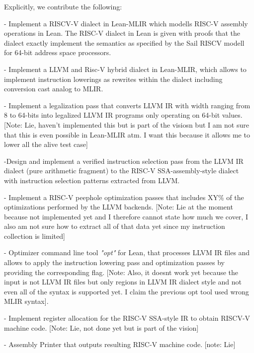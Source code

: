 Explicitly, we contribute the following:

- Implement a RISCV-V dialect in Lean-MLIR which modells RISC-V assembly operations in Lean. The RISC-V dialect in Lean is given with proofs that the dialect exactly implement the semantics as specified by the Sail RISCV modell for 64-bit address space processors.

- Implement a LLVM and Risc-V hybrid dialect in Lean-MLIR, which allows to implement instruction lowerings as rewrites within the dialect including conversion cast analog to MLIR.

- Implement a legalization pass that converts LLVM IR with width ranging from 8 to 64-bits into legalized LLVM IR programs only operating on 64-bit values. 
[Note: Lie, haven't implemented this but is part of the visiosn but I am not sure that this is even possible in Lean-MLIR atm. I want this because it allows me to lower all the alive test case]

-Design and implement a verified instruction selection pass from the LLVM IR dialect (pure arithmetic fragment) to the RISC-V SSA-assembly-style dialect with instruction selection patterns extracted from LLVM.

- Implement a RISC-V peephole optimization passes that includes XY\% of the optimizations performed by the LLVM backends.
[Note: Lie at the moment because not implemented yet and I therefore cannot state how much we cover, I also am not sure how to extract all of that data yet since my instruction collection is limited]

- Optimizer command line tool \textit{"opt"} for Lean, that processes LLVM IR files and allows to apply the instruction lowering pass and optimization passes by providing the corresponding flag.
[Note: Also, it doesnt work yet because the input is not LLVM IR files but only regions in LLVM IR dialect style and not even all of the syntax is supported yet. I claim the previous opt tool used wrong MLIR syntax].

- Implement register allocation for the RISC-V SSA-style IR to obtain RISCV-V machine code.
[Note: Lie, not done yet but is part of the vision]

- Assembly Printer that outputs resulting RISC-V machine code.
[note: Lie]
